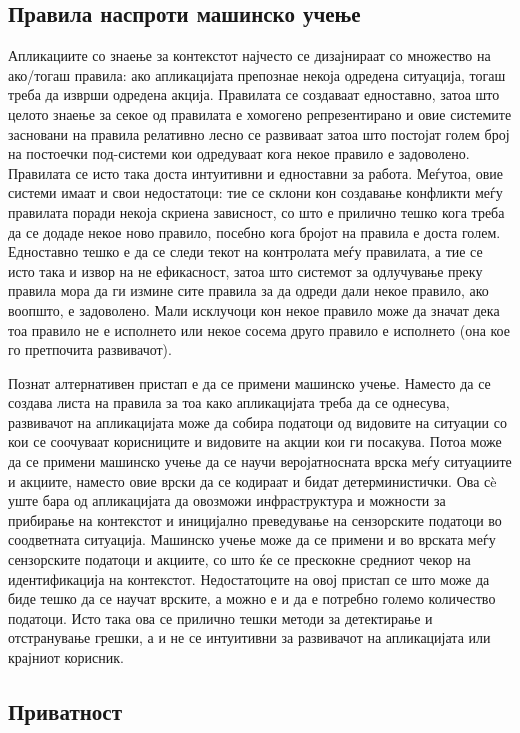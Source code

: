 \subsection{Правила наспроти машинско учење}  

Апликациите со знаење за контекстот најчесто се дизајнираат со множество на
ако/тогаш правила: ако апликацијата препознае некоја одредена ситуација, тогаш
треба да изврши одредена акција. Правилата се создаваат едноставно, затоа што
целото знаење за секое од правилата е хомогено репрезентирано и овие системите
засновани на правила релативно лесно се развиваат затоа што постојат голем број
на постоечки под-системи кои одредуваат кога некое правило е задоволено.
Правилата се исто така доста интуитивни и едноставни за работа. Меѓутоа, овие
системи имаат и свои недостатоци: тие се склони кон создавање конфликти меѓу
правилата поради некоја скриена зависност, со што е прилично тешко кога треба да
се додаде некое ново правило, посебно кога бројот на правила е доста голем.
Едноставно тешко е да се следи текот на контролата меѓу правилата, а тие се исто
така и извор на не ефикасност, затоа што системот за одлучување преку правила
мора да ги измине сите правила за да одреди дали некое правило, ако воопшто, е
задоволено. Мали исклучоци кон некое правило може да значат дека тоа правило не
е исполнето или некое сосема друго правило е исполнето (она кое го претпочита
развивачот).

Познат алтернативен пристап е да се примени машинско учење. Наместо да се
создава листа на правила за тоа како апликацијата треба да се однесува,
развивачот на апликацијата може да собира податоци од видовите на ситуации со
кои се соочуваат корисниците и видовите на акции кои ги посакува. Потоа може да
се примени машинско учење да се научи веројатносната врска меѓу ситуациите и
акциите, наместо овие врски да се кодираат и бидат детерминистички. Ова сè уште
бара од апликацијата да овозможи инфраструктура и можности за прибирање на
контекстот и иницијално преведување на сензорските податоци во соодветната
ситуација. Машинско учење може да се примени и во врската меѓу сензорските
податоци и акциите, со што ќе се прескокне средниот чекор на идентификација на
контекстот. Недостатоците на овој пристап се што може да биде тешко да се научат
врските, а можно е и да е потребно големо количество податоци. Исто така ова се
прилично тешки методи за детектирање и отстранување грешки, а и не се интуитивни
за развивачот на апликацијата или крајниот корисник.

\subsection{Приватност}    

